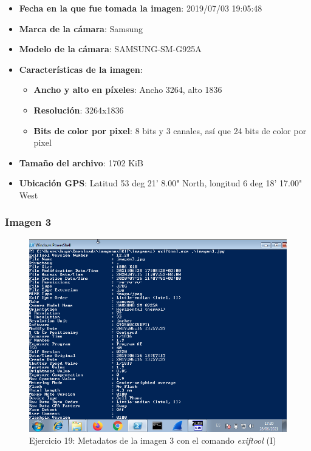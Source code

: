 \documentclass[11pt]{article}
\begin{document}
\begin{itemize}
    \item \textbf{Fecha en la que fue tomada la imagen}: 2019/07/03 19:05:48 
    \item \textbf{Marca de la cámara}: Samsung
    \item \textbf{Modelo de la cámara}: SAMSUNG-SM-G925A
    \item \textbf{Características de la imagen}:
        \begin{itemize}
            \item \textbf{Ancho y alto en píxeles}: Ancho 3264, alto 1836
            \item \textbf{Resolución}: 3264x1836
            \item \textbf{Bits de color por pixel}: 8 bits y 3 canales, así que 24 bits de color por pixel
        \end{itemize}
    \item \textbf{Tamaño del archivo}: 1702 KiB
    \item \textbf{Ubicación GPS}: Latitud 53 deg 21' 8.00" North, longitud 6 deg 18' 17.00" West
\end{itemize}

\subsubsection{Imagen 3}

\begin{figure}[H]
    \caption{Ejercicio 19: Metadatos de la imagen 3 con el comando \textit{exiftool} (I)}
    \centering
    \includegraphics[scale=0.7]{p03/e19-7.png}
\end{figure}
\end{document}
